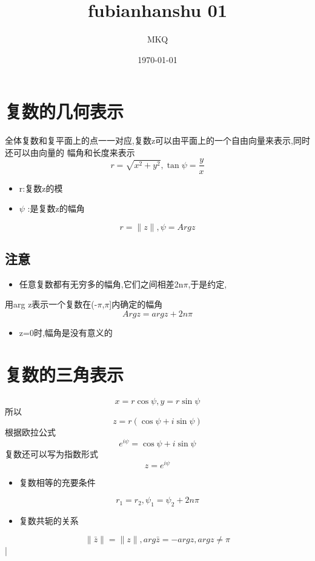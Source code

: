 \documentclass[11pt]{article}
\author{MKQ}
\date{\today}
\title{fubianhanshu 01}
\begin{document}
\maketitle
\tableofcontents

\section{复数的几何表示}
\label{sec:orgc3387d6}
全体复数和复平面上的点一一对应,复数z可以由平面上的一个自由向量来表示,同时还可以由向量的
幅角和长度来表示
\[
r=\sqrt{x^2 +y^2 },\tan\psi =\frac{y}{x}
\]
\begin{itemize}
\item r:复数z的模
\item \(\psi\) :是复数z的幅角
\end{itemize}
\[
r=\|z\|,\psi=Arg z
\]
\subsection{注意}
\label{sec:org67f931c}
\begin{itemize}
\item 任意复数都有无穷多的幅角,它们之间相差2n\(\pi\),于是约定,
\end{itemize}
用arg z表示一个复数在(-\(\pi\),\(\pi\)]内确定的幅角
\[
Arg z=arg z + 2n\pi
\]
\begin{itemize}
\item z=0时,幅角是没有意义的
\end{itemize}
\section{复数的三角表示}
\label{sec:org62444b0}
\[
x=r \cos\psi,y=r\sin\psi
\]
所以
\[
z=r(\cos\psi + i \sin\psi)
\]
根据欧拉公式
\[
e^{i\psi}=\cos \psi + i\sin\psi
\]
复数还可以写为指数形式
\[
z=e^{i\psi}
\]
\begin{itemize}
\item 复数相等的充要条件
\end{itemize}
\[
r_1 =r_2 ,\psi_1 =\psi_2 +2n\pi
\]
\begin{itemize}
\item 复数共轭的关系
\end{itemize}
\[
\| \bar{z} \| = \|z\| ,arg \bar{z}= - arg z,arg z \neq \pi \]                                                                 |
\end{document}
